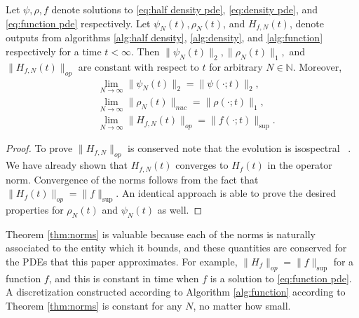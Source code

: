 \documentclass[final,leqno]{siamart}
\newcommand{\ram}[1]{{\normalsize{\textbf{({\color{red}RAMBO:\ }#1)}}}}
\begin{document}
\begin{theorem} \label{thm:norms}
	Let $\psi,\rho,f$ denote solutions to \eqref{eq:half density pde}, \eqref{eq:density pde}, and \eqref{eq:function pde} respectively.
	Let $\psi_{N}(t),\rho_{N}(t)$, and $H_{f,N}(t)$, denote outputs from algorithms \ref{alg:half density}, \ref{alg:density}, and \ref{alg:function} respectively for a time $t < \infty$.
	Then $\| \psi_{N} (t)\|_{2}, \|\rho_{N}(t)\|_{1},$ and $\| H_{f,N}(t) \|_{op}$ are constant with respect to $t$ for arbitrary $N \in \mathbb{N}$.
	Moreover,
	\begin{align*}
		&\lim_{N \to \infty} \| \psi_{N} (t) \|_{2} = \| \psi(\cdot; t) \|_{2}, \\
		&\lim_{N \to \infty} \| \rho_{N}(t) \|_{nuc} = \| \rho(\cdot; t) \|_{1}, \\
		&\lim_{N \to \infty} \| H_{f,N}(t) \|_{op} = \| f( \cdot ;t) \|_{\sup}.
	\end{align*}
\end{theorem}
\begin{proof}
	To prove $\| H_{f,N} \|_{op}$ is conserved note that the evolution is isospectral ~\cite{Calvo1997}.
	We have already shown that $H_{f,N}(t)$ converges to $H_{f}(t)$ in the operator norm.
	Convergence of the norms follows from the fact that $\| H_{f}(t) \|_{op} = \| f \|_{\sup}$.
	An identical approach is able to prove the desired properties for $\rho_{N}(t)$ and $\psi_{N}(t)$ as well.
\end{proof}

Theorem \ref{thm:norms} is valuable because each of the norms is naturally associated to the entity which it bounds, and these quantities are conserved for the PDEs that this paper approximates.
For example, $\| H_{f} \|_{op} = \| f \|_{\sup}$ for a function $f$, and this is constant in time when $f$ is a solution to \eqref{eq:function pde}.
A discretization constructed according to Algorithm \ref{alg:function} according to Theorem \ref{thm:norms} is constant for any $N$, no matter how small.
\end{document}
